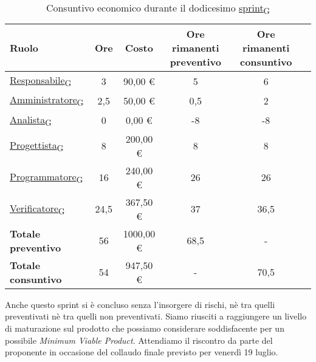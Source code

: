 \newpage
{}
\begin{table}[!h]
    \centering
    \begin{tabular}{ | l | c | c | c | c | c | }
        \hline
        \textbf{Ruolo} & \textbf{Ore} & \textbf{Costo} & \textbf{Ore rimanenti preventivo} & \textbf{Ore rimanenti consuntivo} \\
        \hline
        \href{https://7last.github.io/docs/rtb/documentazione-interna/glossario\#responsabile}{Responsabile\textsubscript{G}}     &  3   &   90,00 € &   5   &   6   \\
        \href{https://7last.github.io/docs/rtb/documentazione-interna/glossario\#amministratore}{Amministratore\textsubscript{G}} &  2,5 &   50,00 € &   0,5 &   2   \\
        \href{https://7last.github.io/docs/rtb/documentazione-interna/glossario\#analista}{Analista\textsubscript{G}}             &  0   &    0,00 € &  -8   &  -8   \\
        \href{https://7last.github.io/docs/rtb/documentazione-interna/glossario\#progettista}{Progettista\textsubscript{G}}       &  8   &  200,00 € &   8   &   8   \\
        \href{https://7last.github.io/docs/rtb/documentazione-interna/glossario\#programmatore}{Programmatore\textsubscript{G}}   & 16   &  240,00 € &  26   &  26   \\
        \href{https://7last.github.io/docs/rtb/documentazione-interna/glossario\#verificatore}{Verificatore\textsubscript{G}}     & 24,5 &  367,50 € &  37   &  36,5 \\
        \hline
        \textbf{Totale preventivo} & 56   & 1000,00 € &  68,5 &   -   \\
        \hline
        \textbf{Totale consuntivo} & 54   &  947,50 € &   -   &  70,5 \\
        \hline
    \end{tabular}
    \caption{Consuntivo economico durante il dodicesimo \href{https://7last.github.io/docs/rtb/documentazione-interna/glossario\#sprint}{sprint\textsubscript{G}}}
\end{table}

Anche questo sprint si è concluso senza l'insorgere di rischi, nè tra quelli preventivati nè tra quelli non preventivati. Siamo riusciti a raggiungere un livello di maturazione sul prodotto che possiamo considerare soddisfacente per un possibile \textit{Minimum Viable Product}. Attendiamo il riscontro da parte del proponente in occasione del collaudo finale previsto per venerdì 19 luglio.